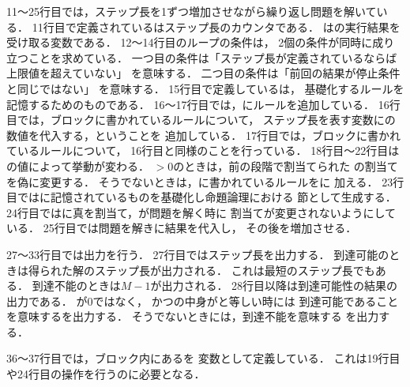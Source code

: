 11～25行目では，ステップ長を1ずつ増加させながら繰り返し問題を解いている．
11行目で定義されているはステップ長のカウンタである．
は{\clingo}の実行結果を受け取る変数である．
12～14行目のループの条件は，
2個の条件が同時に成り立つことを求めている．
一つ目の条件は「ステップ長が定義されているならば上限値を超えていない」
を意味する．
二つ目の条件は「前回の結果が停止条件と同じではない」
を意味する．
15行目で定義しているは，
基礎化するルールを記憶するためのものである．
16～17行目では，にルールを追加している．
16行目では，ブロックに書かれているルールについて，
ステップ長を表す変数にの数値を代入する，ということを
追加している．
17行目では，ブロックに書かれているルールについて，
16行目と同様のことを行っている．
18行目～22行目はの値によって挙動が変わる．
$ > 0$のときは，前の段階で割当てられた
の割当てを偽に変更する．
そうでないときは，に書かれているルールをに
加える．
23行目ではに記憶されているものを基礎化し命題論理における
節として生成する．
24行目ではに真を割当て，{\clingo}が問題を解く時に
割当てが変更されないようにしている．
25行目では問題を解きに結果を代入し，
その後を増加させる．

27～33行目では出力を行う．
27行目ではステップ長を出力する．
到達可能のときは得られた解のステップ長が出力される．
これは最短のステップ長でもある．
到達不能のときは$M-1$が出力される．
28行目以降は到達可能性の結果の出力である．
が$0$ではなく，
かつの中身がと等しい時には
到達可能であることを意味するを出力する．
そうでないときには，到達不能を意味する
を出力する．

36～37行目では，ブロック内にあるを
変数として定義している．
これは19行目や24行目の操作を行うのに必要となる．



